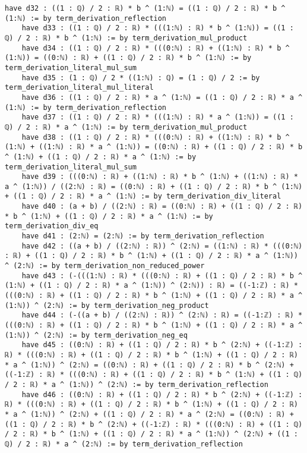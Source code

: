 \documentclass{article}
\begin{document}
\begin{tcolorbox}[colback=white!10, width=\linewidth]
\begin{lstlisting}[language=Lean4]
    have d32 : ((1 : ℚ) / 2 : ℝ) * b ^ (1:ℕ) = ((1 : ℚ) / 2 : ℝ) * b ^ (1:ℕ) := by term_derivation_reflection
    have d33 : ((1 : ℚ) / 2 : ℝ) * (((1:ℕ) : ℝ) * b ^ (1:ℕ)) = ((1 : ℚ) / 2 : ℝ) * b ^ (1:ℕ) := by term_derivation_mul_product
    have d34 : ((1 : ℚ) / 2 : ℝ) * (((0:ℕ) : ℝ) + ((1:ℕ) : ℝ) * b ^ (1:ℕ)) = ((0:ℕ) : ℝ) + ((1 : ℚ) / 2 : ℝ) * b ^ (1:ℕ) := by term_derivation_literal_mul_sum
    have d35 : (1 : ℚ) / 2 * ((1:ℕ) : ℚ) = (1 : ℚ) / 2 := by term_derivation_literal_mul_literal
    have d36 : ((1 : ℚ) / 2 : ℝ) * a ^ (1:ℕ) = ((1 : ℚ) / 2 : ℝ) * a ^ (1:ℕ) := by term_derivation_reflection
    have d37 : ((1 : ℚ) / 2 : ℝ) * (((1:ℕ) : ℝ) * a ^ (1:ℕ)) = ((1 : ℚ) / 2 : ℝ) * a ^ (1:ℕ) := by term_derivation_mul_product
    have d38 : ((1 : ℚ) / 2 : ℝ) * (((0:ℕ) : ℝ) + ((1:ℕ) : ℝ) * b ^ (1:ℕ) + ((1:ℕ) : ℝ) * a ^ (1:ℕ)) = ((0:ℕ) : ℝ) + ((1 : ℚ) / 2 : ℝ) * b ^ (1:ℕ) + ((1 : ℚ) / 2 : ℝ) * a ^ (1:ℕ) := by term_derivation_literal_mul_sum
    have d39 : (((0:ℕ) : ℝ) + ((1:ℕ) : ℝ) * b ^ (1:ℕ) + ((1:ℕ) : ℝ) * a ^ (1:ℕ)) / ((2:ℕ) : ℝ) = ((0:ℕ) : ℝ) + ((1 : ℚ) / 2 : ℝ) * b ^ (1:ℕ) + ((1 : ℚ) / 2 : ℝ) * a ^ (1:ℕ) := by term_derivation_div_literal
    have d40 : (a + b) / ((2:ℕ) : ℝ) = ((0:ℕ) : ℝ) + ((1 : ℚ) / 2 : ℝ) * b ^ (1:ℕ) + ((1 : ℚ) / 2 : ℝ) * a ^ (1:ℕ) := by term_derivation_div_eq
    have d41 : (2:ℕ) = (2:ℕ) := by term_derivation_reflection
    have d42 : ((a + b) / ((2:ℕ) : ℝ)) ^ (2:ℕ) = ((1:ℕ) : ℝ) * (((0:ℕ) : ℝ) + ((1 : ℚ) / 2 : ℝ) * b ^ (1:ℕ) + ((1 : ℚ) / 2 : ℝ) * a ^ (1:ℕ)) ^ (2:ℕ) := by term_derivation_non_reduced_power
    have d43 : (-(((1:ℕ) : ℝ) * (((0:ℕ) : ℝ) + ((1 : ℚ) / 2 : ℝ) * b ^ (1:ℕ) + ((1 : ℚ) / 2 : ℝ) * a ^ (1:ℕ)) ^ (2:ℕ)) : ℝ) = ((-1:ℤ) : ℝ) * (((0:ℕ) : ℝ) + ((1 : ℚ) / 2 : ℝ) * b ^ (1:ℕ) + ((1 : ℚ) / 2 : ℝ) * a ^ (1:ℕ)) ^ (2:ℕ) := by term_derivation_neg_product
    have d44 : (-((a + b) / ((2:ℕ) : ℝ)) ^ (2:ℕ) : ℝ) = ((-1:ℤ) : ℝ) * (((0:ℕ) : ℝ) + ((1 : ℚ) / 2 : ℝ) * b ^ (1:ℕ) + ((1 : ℚ) / 2 : ℝ) * a ^ (1:ℕ)) ^ (2:ℕ) := by term_derivation_neg_eq
    have d45 : ((0:ℕ) : ℝ) + ((1 : ℚ) / 2 : ℝ) * b ^ (2:ℕ) + ((-1:ℤ) : ℝ) * (((0:ℕ) : ℝ) + ((1 : ℚ) / 2 : ℝ) * b ^ (1:ℕ) + ((1 : ℚ) / 2 : ℝ) * a ^ (1:ℕ)) ^ (2:ℕ) = ((0:ℕ) : ℝ) + ((1 : ℚ) / 2 : ℝ) * b ^ (2:ℕ) + ((-1:ℤ) : ℝ) * (((0:ℕ) : ℝ) + ((1 : ℚ) / 2 : ℝ) * b ^ (1:ℕ) + ((1 : ℚ) / 2 : ℝ) * a ^ (1:ℕ)) ^ (2:ℕ) := by term_derivation_reflection
    have d46 : ((0:ℕ) : ℝ) + ((1 : ℚ) / 2 : ℝ) * b ^ (2:ℕ) + ((-1:ℤ) : ℝ) * (((0:ℕ) : ℝ) + ((1 : ℚ) / 2 : ℝ) * b ^ (1:ℕ) + ((1 : ℚ) / 2 : ℝ) * a ^ (1:ℕ)) ^ (2:ℕ) + ((1 : ℚ) / 2 : ℝ) * a ^ (2:ℕ) = ((0:ℕ) : ℝ) + ((1 : ℚ) / 2 : ℝ) * b ^ (2:ℕ) + ((-1:ℤ) : ℝ) * (((0:ℕ) : ℝ) + ((1 : ℚ) / 2 : ℝ) * b ^ (1:ℕ) + ((1 : ℚ) / 2 : ℝ) * a ^ (1:ℕ)) ^ (2:ℕ) + ((1 : ℚ) / 2 : ℝ) * a ^ (2:ℕ) := by term_derivation_reflection

\end{lstlisting}
\end{tcolorbox}
\end{document}
